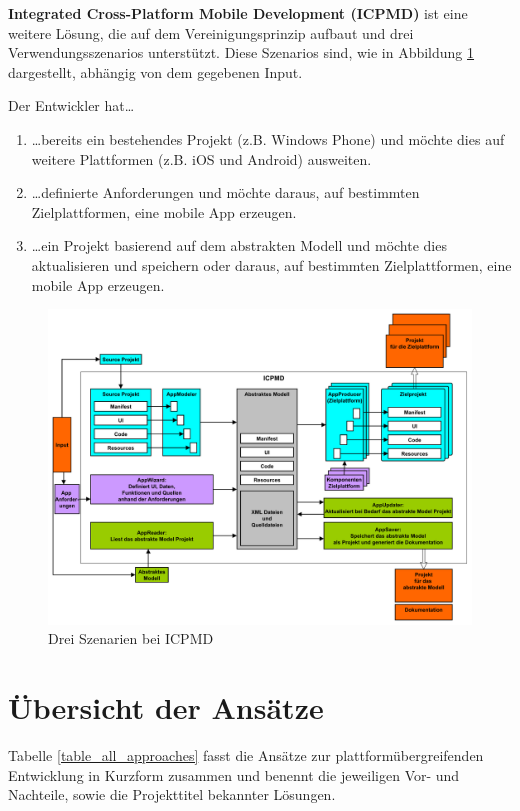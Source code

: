 \bigskip
\textbf{Integrated Cross-Platform Mobile Development (ICPMD)} ist eine weitere Lösung, die auf dem Vereinigungsprinzip aufbaut und drei Verwendungsszenarios unterstützt. Diese Szenarios sind, wie in Abbildung \ref{graph_merge_integrated_based} dargestellt, abhängig von dem gegebenen Input.

\bigskip 
Der Entwickler hat…
 
\begin{enumerate}
	\item …bereits ein bestehendes Projekt (z.B. Windows Phone) und möchte dies auf weitere Plattformen (z.B. iOS und Android) ausweiten.
	
	\item …definierte Anforderungen und möchte daraus, auf bestimmten Zielplattformen, eine mobile App erzeugen.
	
	\item …ein Projekt basierend auf dem abstrakten Modell und möchte dies aktualisieren und speichern oder daraus, auf bestimmten Zielplattformen, eine mobile App erzeugen.
\end{enumerate}

\begin{figure}[htbp]
	\centering
	\includegraphics[width=1\textwidth]{Bilder/Merge_Integrated_based}
	\caption{Drei Szenarien bei ICPMD}\label{graph_merge_integrated_based}
\end{figure}

\section{Übersicht der Ansätze}
Tabelle \ref{table_all_approaches} fasst die Ansätze zur plattformübergreifenden Entwicklung in Kurzform zusammen und benennt die jeweiligen Vor- und Nachteile, sowie die Projekttitel bekannter Lösungen.

